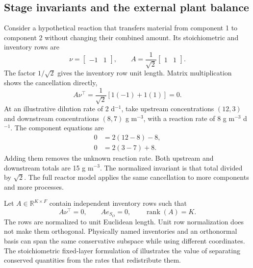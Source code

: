 \subsection{Stage invariants and the external plant balance}

Consider a hypothetical reaction that transfers material from component 1 to component 2 without changing their combined amount. Its stoichiometric and inventory rows are
\begin{equation}
\nu=\begin{bmatrix}-1&1\end{bmatrix},\qquad
A=\frac1{\sqrt2}\begin{bmatrix}1&1\end{bmatrix}.
\end{equation}
The factor $1/\sqrt2$ gives the inventory row unit length. Matrix multiplication shows the cancellation directly,
\begin{equation}
A\nu^\top=\frac1{\sqrt2}\left[1(-1)+1(1)\right]=0.
\end{equation}
At an illustrative dilution rate of 2 d$^{-1}$, take upstream concentrations $(12,3)$ and downstream concentrations $(8,7)$ g m$^{-3}$, with a reaction rate of 8 g m$^{-3}$ d$^{-1}$. The component equations are
\begin{align}
0&=2(12-8)-8,\\
0&=2(3-7)+8.
\end{align}
Adding them removes the unknown reaction rate. Both upstream and downstream totals are 15 g m$^{-3}$. The normalized invariant is that total divided by $\sqrt2$. The full reactor model applies the same cancellation to more components and more processes.

Let $A\in\mathbb R^{K\times F}$ contain independent inventory rows such that
\begin{equation}
A\nu^\top=0,\qquad Ae_{S_O}=0,\qquad
\operatorname{rank}(A)=K.
\label{eq:plant_invariant_operator}
\end{equation}
The rows are normalized to unit Euclidean length. Unit row normalization does not make them orthogonal. Physically named inventories and an orthonormal basis can span the same conservative subspace while using different coordinates. The stoichiometric fixed-layer formulation of \citet{SturmWexler2022} illustrates the value of separating conserved quantities from the rates that redistribute them.

